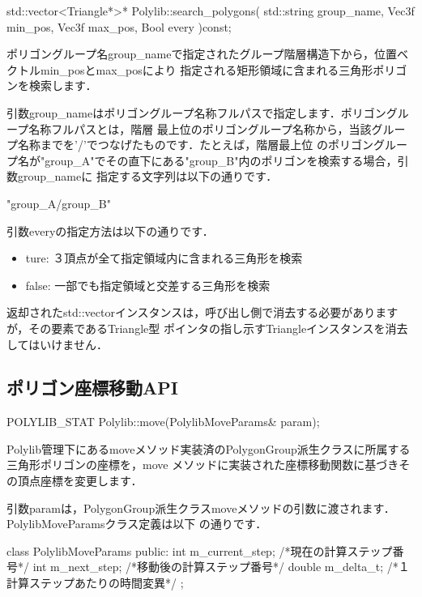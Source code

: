 {\begin{program}
	std::vector<Triangle*>* Polylib::search_polygons(
		std::string	group_name,
		Vec3f		min_pos,
		Vec3f		max_pos,
		Bool		every
	)const;
\end{program}

ポリゴングループ名group\_nameで指定されたグループ階層構造下から，位置ベクトルmin\_posとmax\_posにより
指定される矩形領域に含まれる三角形ポリゴンを検索します．

引数group\_nameはポリゴングループ名称フルパスで指定します．ポリゴングループ名称フルパスとは，階層
最上位のポリゴングループ名称から，当該グループ名称までを'/'でつなげたものです．たとえば，階層最上位
のポリゴングループ名が"group\_A"でその直下にある"group\_B"内のポリゴンを検索する場合，引数group\_nameに
指定する文字列は以下の通りです．

\begin{program}
	"group_A/group_B"
\end{program}

引数everyの指定方法は以下の通りです．

\begin{itemize}
 \item ture:	３頂点が全て指定領域内に含まれる三角形を検索
 \item false:	一部でも指定領域と交差する三角形を検索
\end{itemize}

返却されたstd::vectorインスタンスは，呼び出し側で消去する必要がありますが，その要素であるTriangle型
ポインタの指し示すTriangleインスタンスを消去してはいけません．

%
\subsection{ポリゴン座標移動API}

\begin{program}
	POLYLIB_STAT Polylib::move(PolylibMoveParams& param);
\end{program}

Polylib管理下にあるmoveメソッド実装済のPolygonGroup派生クラスに所属する三角形ポリゴンの座標を，move
メソッドに実装された座標移動関数に基づきその頂点座標を変更します．

引数paramは，PolygonGroup派生クラスmoveメソッドの引数に渡されます．PolylibMoveParamsクラス定義は以下
の通りです．

\begin{program}
	class PolylibMoveParams {
	public:
		int m_current_step;	/*現在の計算ステップ番号*/
		int m_next_step;	/*移動後の計算ステップ番号*/
		double m_delta_t;	/*１計算ステップあたりの時間変異*/
	};
\end{program}

}
